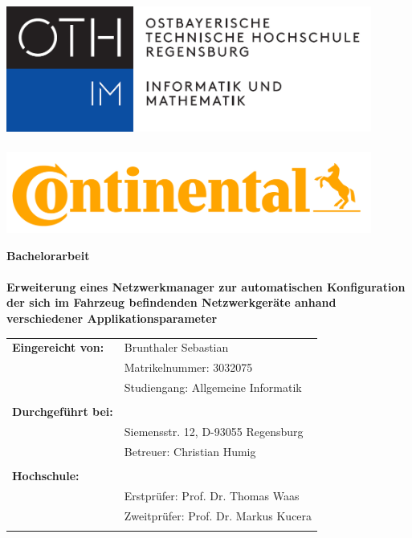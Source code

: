 \def\acroname{Titelseite}
\includegraphics[width=12cm]{99_IMG/00_img/FSIM_logo.png}
\\
\\
\includegraphics[width=12cm]{99_IMG/00_img/continental-logo-yellow-srgb-png-data.png}


\vspace*{2cm}

\Large \textbf{Bachelorarbeit} \\
\\
\normalsize \textbf{Erweiterung eines Netzwerkmanager zur automatischen Konfiguration der sich im Fahrzeug befindenden Netzwerkgeräte anhand verschiedener \newline Applikationsparameter} \\

\vspace{0.5cm}

\normalsize
\hspace{-2mm}
\begin{tabularx}{\textwidth}{l X}
	\textbf{Eingereicht von:} & Brunthaler Sebastian \\
							  & Matrikelnummer: 3032075 \\
							  & Studiengang: Allgemeine Informatik \\
							  & \\
%
	\textbf{Durchgeführt bei:} & \conti \\
								& Siemensstr. 12, D-93055 Regensburg  \\
								& Betreuer: Christian Humig \\
								& \\
								
	\textbf{Hochschule:} & \oth \\
								& Erstprüfer: Prof. Dr. Thomas Waas \\
								& Zweitprüfer: Prof. Dr. Markus Kucera \\
								& \\
%					 
\end{tabularx}